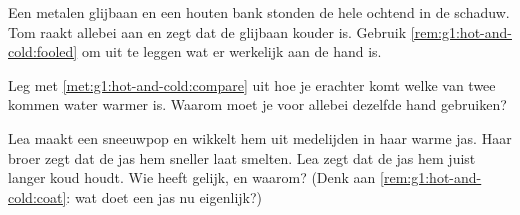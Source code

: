 \begin{exercise}[$\star$]\label{exo:g1:hot-and-cold:7}
Een metalen glijbaan en een houten bank stonden de hele ochtend in de
schaduw. Tom raakt allebei aan en zegt dat de glijbaan kouder is.
Gebruik \cref{rem:g1:hot-and-cold:fooled} om uit te leggen wat er
werkelijk aan de hand is.
\end{exercise}

\begin{exercise}[$\star$]\label{exo:g1:hot-and-cold:8}
Leg met \cref{met:g1:hot-and-cold:compare} uit hoe je erachter komt
welke van twee kommen water warmer is. Waarom moet je voor allebei
dezelfde hand gebruiken?
\end{exercise}

\begin{exercise}[$\star\star$]\label{exo:g1:hot-and-cold:9}
Lea maakt een sneeuwpop en wikkelt hem uit medelijden in haar warme
jas. Haar broer zegt dat de jas hem sneller laat smelten. Lea zegt
dat de jas hem juist langer koud houdt. Wie heeft gelijk, en waarom?
(Denk aan \cref{rem:g1:hot-and-cold:coat}: wat doet een jas nu
eigenlijk?)
\end{exercise}
